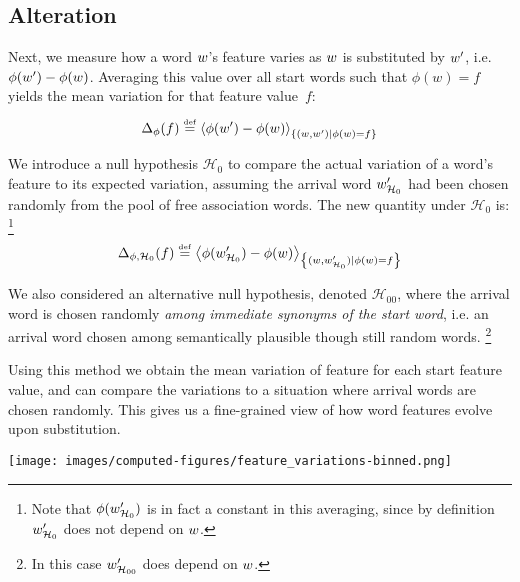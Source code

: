 \subsection{Alteration}

Next, we measure how a word $w$'s feature varies as $w$ is substituted by $w'$, i.e. $\phi(w') - \phi(w)$.
Averaging this value over all start words such that $\phi(w) = f$ yields the mean variation for that feature value~$f$:
$$\Delta_{\phi}(f) \overset{\underset{\mathrm{def}}{}}{=} \left< \phi(w') - \phi(w) \right>_{\left\lbrace (w,w') | \phi(w) = f \right\rbrace}$$

We introduce a null hypothesis $\mathcal{H}_0$ to compare the actual variation of a word's feature to its expected variation, assuming the arrival word $w'_{\mathcal{H}_0}$ had been chosen randomly from the pool of free association words.
The new quantity under $\mathcal{H}_0$ is:
\footnote{Note that $\phi(w'_{\mathcal{H}_0})$ is in fact a constant in this averaging, since by definition $w'_{\mathcal{H}_0}$ does not depend on $w$.}
$$\Delta_{\phi, \mathcal{H}_0}(f) \overset{\underset{\mathrm{def}}{}}{=} \left< \phi({w'_{\mathcal{H}_0}}) - \phi(w) \right>_{\left\lbrace (w,w'_{\mathcal{H}_0}) | \phi(w) = f \right\rbrace}$$

We also considered an alternative null hypothesis, denoted $\mathcal{H}_{00}$, where the arrival word is chosen randomly \emph{among immediate synonyms of the start word}, i.e. an arrival word chosen among semantically plausible though still random words.
\footnote{In this case $w'_{\mathcal{H}_{00}}$ does depend on $w$.} 

Using this method we obtain the mean variation of feature for each start feature value, and can compare the variations to a situation where arrival words are chosen randomly.
This gives us a fine-grained view of how word features evolve upon substitution.


\begin{figure*}[!th]
    \centering
    \texttt{[image: images/computed-figures/feature\_variations-binned.png]}
    \caption{\textbf{Feature variation upon substitution:} average feature of the appearing word minus $\mathcal{H}_0$ \emph{v.} average feature of the disappearing word in a substitution, with 95\% asymptotic confidence intervals.
    The overall position of the curve with respect to $y = 0$ indicates the direction of the cognitive bias.
    The fact that all the curves have positive slopes shows the influence of the disappearing word on the appearing word (indeed, the contraposition is that selection of the appearing word independently from the disappearing word would produce horizontal curves).
    Finally, the fact that all the curves also have slopes smaller than 1 means that the substitution operation is contractile on average: each feature will converge towards its own specific asymptotic range, which is consistent with the evolution observed in Figure~\ref{fig:timebags-evolution}.}
    \label{fig:feature-variations}
\end{figure*}


